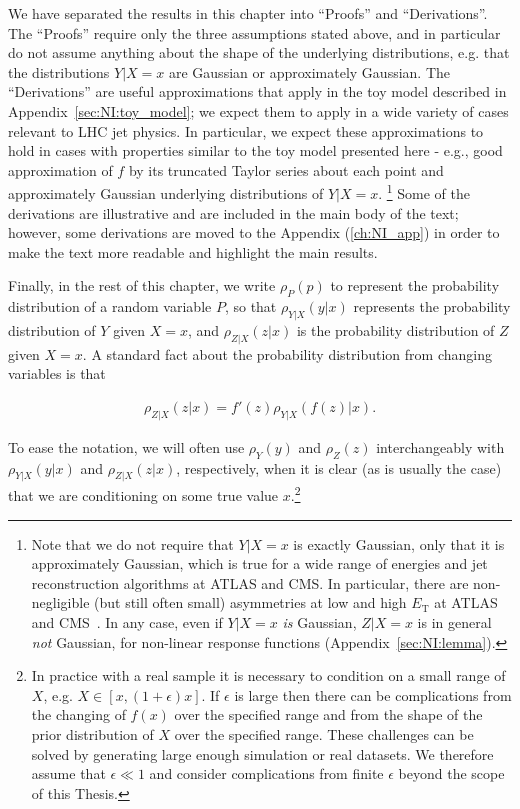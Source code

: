 We have separated the results in this chapter into ``Proofs'' and ``Derivations''.
The ``Proofs'' require only the three assumptions stated above, and in particular do not assume anything about the shape of the underlying distributions, e.g. that the distributions $Y|X=x$ are Gaussian or approximately Gaussian.
The ``Derivations'' are useful approximations that apply in the toy model described in Appendix~\ref{sec:NI:toy_model}; we expect them to apply in a wide variety of cases relevant to LHC jet physics.
In particular, we expect these approximations to hold in cases with properties similar to the toy model presented here - e.g., good approximation of $f$ by its truncated Taylor series about each point and approximately Gaussian underlying distributions of $Y|X=x$.
\footnote{Note that we do not require that $Y|X=x$ is exactly Gaussian, only that it is approximately Gaussian, which is true for a wide range of energies and jet reconstruction algorithms at ATLAS and CMS. In particular, there are non-negligible (but still often small) asymmetries at low and high $E_\text{T}$ at ATLAS and CMS~\cite{Aad:2011he,Chatrchyan:2011ds,Khachatryan:2016kdb}. In any case, even if $Y|X=x$ {\it is} Gaussian, $Z|X=x$ is in general {\it not} Gaussian, for non-linear response functions (Appendix~\ref{sec:NI:lemma}).}
Some of the derivations are illustrative and are included in the main body of the text; however, some derivations are moved to the Appendix (\ref{ch:NI_app}) in order to make the text more readable and highlight the main results.

Finally, in the rest of this chapter, we write $\rho_P(p)$ to represent the probability distribution of a random variable $P$, so that $\rho_{Y|X}(y|x)$ represents the probability distribution of $Y$ given $X=x$, and $\rho_{Z|X}(z|x)$ is the probability distribution of $Z$ given $X=x$.
A standard fact about the probability distribution from changing variables is that

\begin{align}
\rho_{Z|X}(z|x) = f'(z)\rho_{Y|X}(f(z)|x).
\label{eqn:NI:newdist}
\end{align}

To ease the notation, we will often use $\rho_Y(y)$ and $\rho_Z(z)$ interchangeably with $\rho_{Y|X}(y|x)$ and $\rho_{Z|X}(z|x)$, respectively, when it is clear (as is usually the case) that we are conditioning on some true value $x$.\footnote{In practice with a real sample it is necessary to condition on a small range of $X$, e.g. $X\in[x,(1+\epsilon)x]$. If $\epsilon$ is large then there can be complications from the changing of $f(x)$ over the specified range and from the shape of the prior distribution of $X$ over the specified range.  These challenges can be solved by generating large enough simulation or real datasets.  We therefore assume that $\epsilon \ll 1$ and consider complications from finite $\epsilon$ beyond the scope of this Thesis.}

